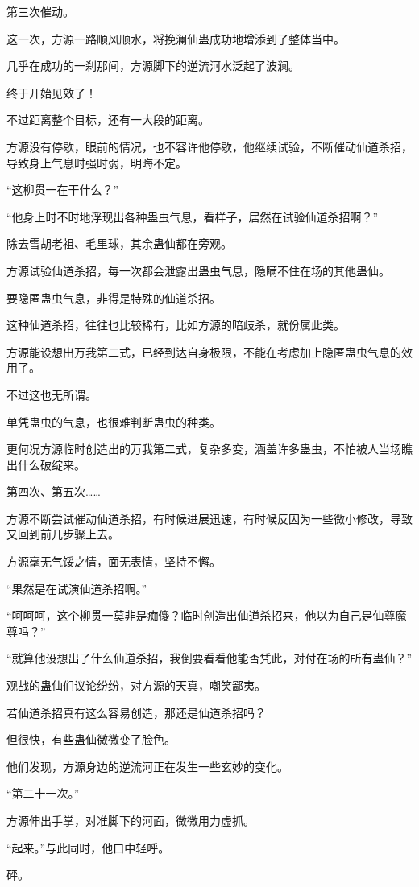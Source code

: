 \begin{this_body}
第三次催动。

这一次，方源一路顺风顺水，将挽澜仙蛊成功地增添到了整体当中。

几乎在成功的一刹那间，方源脚下的逆流河水泛起了波澜。

终于开始见效了！

不过距离整个目标，还有一大段的距离。

方源没有停歇，眼前的情况，也不容许他停歇，他继续试验，不断催动仙道杀招，导致身上气息时强时弱，明晦不定。

“这柳贯一在干什么？”

“他身上时不时地浮现出各种蛊虫气息，看样子，居然在试验仙道杀招啊？”

除去雪胡老祖、毛里球，其余蛊仙都在旁观。

方源试验仙道杀招，每一次都会泄露出蛊虫气息，隐瞒不住在场的其他蛊仙。

要隐匿蛊虫气息，非得是特殊的仙道杀招。

这种仙道杀招，往往也比较稀有，比如方源的暗歧杀，就份属此类。

方源能设想出万我第二式，已经到达自身极限，不能在考虑加上隐匿蛊虫气息的效用了。

不过这也无所谓。

单凭蛊虫的气息，也很难判断蛊虫的种类。

更何况方源临时创造出的万我第二式，复杂多变，涵盖许多蛊虫，不怕被人当场瞧出什么破绽来。

第四次、第五次……

方源不断尝试催动仙道杀招，有时候进展迅速，有时候反因为一些微小修改，导致又回到前几步骤上去。

方源毫无气馁之情，面无表情，坚持不懈。

“果然是在试演仙道杀招啊。”

“呵呵呵，这个柳贯一莫非是痴傻？临时创造出仙道杀招来，他以为自己是仙尊魔尊吗？”

“就算他设想出了什么仙道杀招，我倒要看看他能否凭此，对付在场的所有蛊仙？”

观战的蛊仙们议论纷纷，对方源的天真，嘲笑鄙夷。

若仙道杀招真有这么容易创造，那还是仙道杀招吗？

但很快，有些蛊仙微微变了脸色。

他们发现，方源身边的逆流河正在发生一些玄妙的变化。

“第二十一次。”

方源伸出手掌，对准脚下的河面，微微用力虚抓。

“起来。”与此同时，他口中轻呼。

砰。


\end{this_body}
